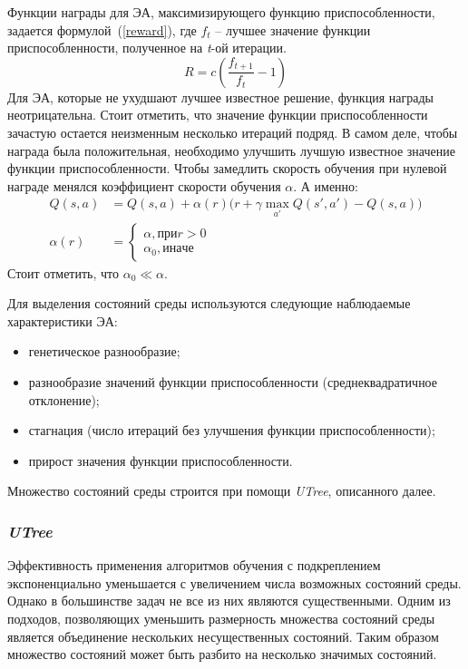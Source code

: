 Функции награды для ЭА, максимизирующего функцию приспособленности, задается формулой~(\ref{reward}), где $f_t$ -- лучшее значение функции приспособленности, полученное на \textit{t}-ой итерации.
\begin{equation}
\label{reward}
R = c(\frac{f_{t+1}}{f_t} - 1)
\end{equation}
Для ЭА, которые не ухудшают лучшее известное решение, функция награды неотрицательна. Стоит отметить, что значение функции приспособленности зачастую остается неизменным несколько итераций подряд. В самом деле, чтобы награда была положительная, необходимо улучшить лучшую известное значение функции приспособленности. Чтобы замедлить скорость обучения при нулевой награде менялся коэффициент скорости обучения $\alpha$. А именно:
\begin{align*}
Q(s,a) &= Q(s,a) + \alpha(r)(r + \gamma \max_{a'}{Q(s',a') - Q(s, a))} \\
\alpha(r) &= \begin{cases}\alpha, при r > 0 \\ \alpha_0, иначе \end{cases}
\end{align*}
Стоит отметить, что $\alpha_0 \ll \alpha$.

Для выделения состояний среды используются следующие наблюдаемые характеристики ЭА:
\begin{itemize}
    \item генетическое разнообразие;
    \item разнообразие значений функции приспособленности (среднеквадратичное отклонение);
    \item стагнация (число итераций без улучшения функции приспособленности);
    \item прирост значения функции приспособленности.
\end{itemize}
Множество состояний среды строится при помощи \textit{UTree}, описанного далее.

\subsubsection{\textit{UTree}}
\label{utree}
Эффективность применения алгоритмов обучения с подкреплением экспоненциально уменьшается с увеличением числа возможных состояний среды. Однако в большинстве задач не все из них являются существенными. Одним из подходов, позволяющих уменьшить размерность множества состояний среды является объединение нескольких несущественных состояний. Таким образом множество состояний может быть разбито на несколько значимых состояний. 

